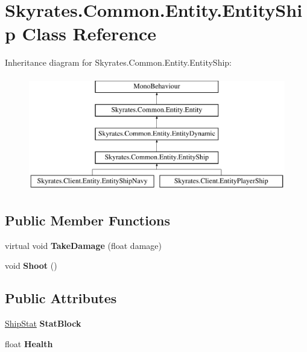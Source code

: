 \hypertarget{class_skyrates_1_1_common_1_1_entity_1_1_entity_ship}{\section{Skyrates.\-Common.\-Entity.\-Entity\-Ship Class Reference}
\label{class_skyrates_1_1_common_1_1_entity_1_1_entity_ship}
}
Inheritance diagram for Skyrates.\-Common.\-Entity.\-Entity\-Ship\-:\begin{figure}[H]
\begin{center}
\leavevmode
\includegraphics[height=5.000000cm]{class_skyrates_1_1_common_1_1_entity_1_1_entity_ship}
\end{center}
\end{figure}
\subsection*{Public Member Functions}
\begin{DoxyCompactItemize}
\item 
\hypertarget{class_skyrates_1_1_common_1_1_entity_1_1_entity_ship_aca5b5a0a66a11d077def4cb2885307e2}{virtual void {\bfseries Take\-Damage} (float damage)}\label{class_skyrates_1_1_common_1_1_entity_1_1_entity_ship_aca5b5a0a66a11d077def4cb2885307e2}

\item 
\hypertarget{class_skyrates_1_1_common_1_1_entity_1_1_entity_ship_a6020733d9aff38c4afb683e0529eaf48}{void {\bfseries Shoot} ()}\label{class_skyrates_1_1_common_1_1_entity_1_1_entity_ship_a6020733d9aff38c4afb683e0529eaf48}

\end{DoxyCompactItemize}
\subsection*{Public Attributes}
\begin{DoxyCompactItemize}
\item 
\hypertarget{class_skyrates_1_1_common_1_1_entity_1_1_entity_ship_a11f35fb2c23a46c0c2d4980b1fa3380c}{\hyperlink{class_ship_stat}{Ship\-Stat} {\bfseries Stat\-Block}}\label{class_skyrates_1_1_common_1_1_entity_1_1_entity_ship_a11f35fb2c23a46c0c2d4980b1fa3380c}

\item 
\hypertarget{class_skyrates_1_1_common_1_1_entity_1_1_entity_ship_af4bb39bce0cf06de062a3676699c5224}{float {\bfseries Health}}\label{class_skyrates_1_1_common_1_1_entity_1_1_entity_ship_af4bb39bce0cf06de062a3676699c5224}

\end{DoxyCompactItemize}
